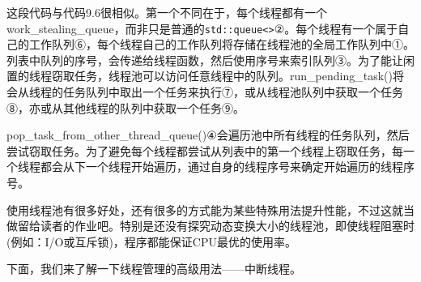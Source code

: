 这段代码与代码9.6很相似。第一个不同在于，每个线程都有一个work\_stealing\_queue，而非只是普通的\texttt{std::queue<>}②。每个线程有一个属于自己的工作队列⑥，每个线程自己的工作队列将存储在线程池的全局工作队列中①。列表中队列的序号，会传递给线程函数，然后使用序号来索引队列③。为了能让闲置的线程窃取任务，线程池可以访问任意线程中的队列。run\_pending\_task()将会从线程的任务队列中取出一个任务来执行⑦，或从线程池队列中获取一个任务⑧，亦或从其他线程的队列中获取一个任务⑨。

pop\_task\_from\_other\_thread\_queue()④会遍历池中所有线程的任务队列，然后尝试窃取任务。为了避免每个线程都尝试从列表中的第一个线程上窃取任务，每一个线程都会从下一个线程开始遍历，通过自身的线程序号来确定开始遍历的线程序号。

使用线程池有很多好处，还有很多的方式能为某些特殊用法提升性能，不过这就当做留给读者的作业吧。特别是还没有探究动态变换大小的线程池，即使线程阻塞时(例如：I/O或互斥锁)，程序都能保证CPU最优的使用率。

下面，我们来了解一下线程管理的高级用法——中断线程。